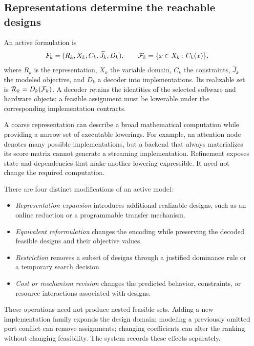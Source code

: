 \subsection{Representations determine the reachable designs}
An active formulation is
\begin{equation}
 F_k=(R_k,X_k,C_k,\widehat J_k,D_k),\qquad
 \mathcal F_k=\{x\in X_k:C_k(x)\},\label{eq:formulation}
\end{equation}
where $R_k$ is the representation, $X_k$ the variable domain, $C_k$ the constraints, $\widehat J_k$ the modeled objective, and $D_k$ a decoder into implementations. Its realizable set is $\mathcal R_k=D_k(\mathcal F_k)$. A decoder retains the identities of the selected software and hardware objects; a feasible assignment must be lowerable under the corresponding implementation contracts.

A coarse representation can describe a broad mathematical computation while providing a narrow set of executable lowerings. For example, an attention node denotes many possible implementations, but a backend that always materializes its score matrix cannot generate a streaming implementation. Refinement exposes state and dependencies that make another lowering expressible. It need not change the required computation.

There are four distinct modifications of an active model:
\begin{itemize}
\item \emph{Representation expansion} introduces additional realizable designs, such as an online reduction or a programmable transfer mechanism.
\item \emph{Equivalent reformulation} changes the encoding while preserving the decoded feasible designs and their objective values.
\item \emph{Restriction} removes a subset of designs through a justified dominance rule or a temporary search decision.
\item \emph{Cost or mechanism revision} changes the predicted behavior, constraints, or resource interactions associated with designs.
\end{itemize}
These operations need not produce nested feasible sets. Adding a new implementation family expands the design domain; modeling a previously omitted port conflict can remove assignments; changing coefficients can alter the ranking without changing feasibility. The system records these effects separately.

